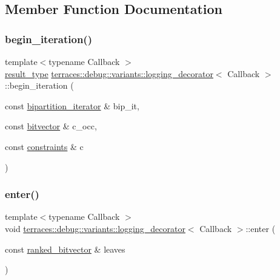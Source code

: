 \subsection{Member Function Documentation}
\mbox{\label{classterraces_1_1debug_1_1variants_1_1logging__decorator_abd1db25829d4a60328582e094d36c4fd}} 
\subsubsection{\texorpdfstring{begin\+\_\+iteration()}{begin\_iteration()}}
{\footnotesize\ttfamily template$<$typename Callback $>$ \\
\hyperlink{classterraces_1_1debug_1_1variants_1_1logging__decorator_a7c08c8ede1f8c884a3bab0437b244f55}{result\+\_\+type} \hyperlink{classterraces_1_1debug_1_1variants_1_1logging__decorator}{terraces\+::debug\+::variants\+::logging\+\_\+decorator}$<$ Callback $>$\+::begin\+\_\+iteration (\begin{DoxyParamCaption}\item[{const \hyperlink{classterraces_1_1bipartition__iterator}{bipartition\+\_\+iterator} \&}]{bip\+\_\+it,  }\item[{const \hyperlink{namespaceterraces_a1b526fb554dff829f7ad51eb21d5ed06}{bitvector} \&}]{c\+\_\+occ,  }\item[{const \hyperlink{namespaceterraces_a6f603ffd30ed4d902fce6424492e0581}{constraints} \&}]{c }\end{DoxyParamCaption})\hspace{0.3cm}{\ttfamily [inline]}}

\mbox{\label{classterraces_1_1debug_1_1variants_1_1logging__decorator_a05818c97704f093630e84b915b58a5cd}} 
\subsubsection{\texorpdfstring{enter()}{enter()}}
{\footnotesize\ttfamily template$<$typename Callback $>$ \\
void \hyperlink{classterraces_1_1debug_1_1variants_1_1logging__decorator}{terraces\+::debug\+::variants\+::logging\+\_\+decorator}$<$ Callback $>$\+::enter (\begin{DoxyParamCaption}\item[{const \hyperlink{namespaceterraces_acc45ec9c561024c50ecbce5b6738ba08}{ranked\+\_\+bitvector} \&}]{leaves }\end{DoxyParamCaption})\hspace{0.3cm}{\ttfamily [inline]}}

